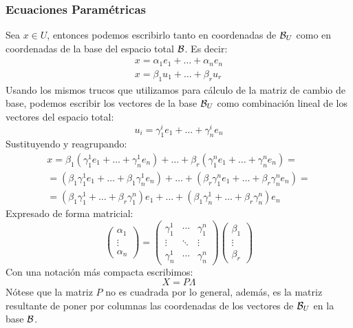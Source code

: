 \subsubsection{Ecuaciones Paramétricas}
Sea $x\in U$, entonces podemos escribirlo tanto en coordenadas de $\mathcal{B}_U$ como en coordenadas de la base del espacio total $\mathcal{B}$. Es decir:
\begin{gather}
	x = \alpha_1e_1+\dots+\alpha_ne_n\\
	x = \beta_1u_1+\dots+\beta_ru_r
\end{gather}
Usando los mismos trucos que utilizamos para cálculo de la matriz de cambio de base, podemos escribir los vectores de la base $\mathcal{B}_U$ como combinación lineal de los vectores del espacio total:
\begin{equation}
	u_i=\gamma_1^ie_1+\dots+\gamma_n^ie_n
\end{equation}
Sustituyendo y reagrupando:
\begin{multline}
	x=\beta_1(\gamma_1^1e_1+\dots+\gamma_n^1e_n)+\dots+\beta_r(\gamma_1^ne_1+\dots+\gamma_n^ne_n)=\\
	= (\beta_1\gamma_1^1e_1+\dots+\beta_1\gamma_n^1e_n)+\dots+(\beta_r\gamma_1^ne_1+\dots+\beta_r\gamma_n^ne_n)=\\
	= (\beta_1\gamma_1^1+\dots+\beta_r\gamma_1^n)e_1+\dots+(\beta_1\gamma_n^1+\dots+\beta_r\gamma_n^n)e_n
\end{multline}
Expresado de forma matricial:
\begin{equation}
	\begin{pmatrix}
	\alpha_1\\
	\vdots\\
	\alpha_n
	\end{pmatrix}=\begin{pmatrix}
	\gamma_1^1 & \cdots & \gamma_1^n\\
	\vdots & \ddots & \vdots\\
	\gamma_n^1 & \cdots & \gamma_n^n 
	\end{pmatrix}\begin{pmatrix}
	\beta_1\\
	\vdots\\
	\beta_r
	\end{pmatrix}
\end{equation}
Con una notación más compacta escribimos:
\begin{equation}
	X=P\Lambda
\end{equation}
Nótese que la matriz $P$ no es cuadrada por lo general, además, es la matriz resultante de poner por columnas las coordenadas de los vectores de $\mathcal{B}_U$ en la base $\mathcal{B}$.

